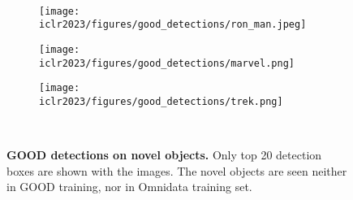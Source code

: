 \documentclass{article} \usepackage{iclr2023_conference,times}
\begin{document}
\begin{figure}
\begin{subfigure}[b]{0.28\textwidth}
\label{fig:five over x}
     \end{subfigure} 
     \\
      \begin{subfigure}[b]{0.3\textwidth}
         \centering
         \texttt{[image: iclr2023/figures/good\_detections/ron\_man.jpeg]}
\label{fig:five over x}
     \end{subfigure} 
     \begin{subfigure}[b]{0.31\textwidth}
         \centering
         \texttt{[image: iclr2023/figures/good\_detections/marvel.png]}
\label{fig:three sin x}
     \end{subfigure}
     \begin{subfigure}[b]{0.31\textwidth}
         \centering
         \texttt{[image: iclr2023/figures/good\_detections/trek.png]}
\label{fig:five over x}
     \end{subfigure} 
     \\
    \caption{\textbf{GOOD detections on novel objects.} Only top 20 detection boxes are shown with the images. The novel objects are  seen neither in GOOD training, nor in Omnidata training set.}
        \label{fig:novel-1}
\end{figure}
 
\end{document}
